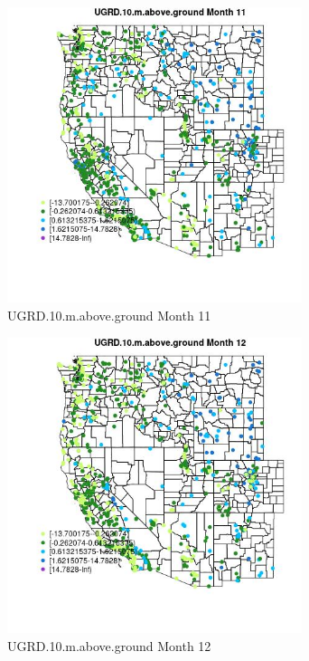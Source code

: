 \begin{figure} 
\centering  
\includegraphics[width=0.77\textwidth]{Code_Outputs/Report_ML_input_PM25_Step4_part_f_de_duplicated_aveswNAs_MapObsMo11UGRD10maboveground.jpg} 
\caption{\label{fig:Report_ML_input_PM25_Step4_part_f_de_duplicated_aveswNAsMapObsMo11UGRD10maboveground}UGRD.10.m.above.ground Month 11} 
\end{figure} 
 

\begin{figure} 
\centering  
\includegraphics[width=0.77\textwidth]{Code_Outputs/Report_ML_input_PM25_Step4_part_f_de_duplicated_aveswNAs_MapObsMo12UGRD10maboveground.jpg} 
\caption{\label{fig:Report_ML_input_PM25_Step4_part_f_de_duplicated_aveswNAsMapObsMo12UGRD10maboveground}UGRD.10.m.above.ground Month 12} 
\end{figure} 
 

